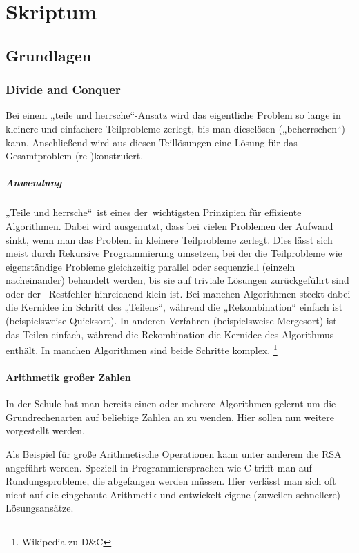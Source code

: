 \documentclass[a4paper,twoside,10pt]{report}
\begin{document}
\part{Skriptum}
\chapter{Grundlagen}
\section{Divide and Conquer}
Bei einem „teile und herrsche“-Ansatz wird das eigentliche Problem so lange in kleinere und einfachere Teilprobleme zerlegt, bis man diese\linebreak lösen („beherrschen“) kann. Anschließend wird aus diesen Teillösungen eine Lösung für das Gesamtproblem (re-)konstruiert.
\subsubsection{Anwendung}
„Teile und herrsche“ \,ist eines der \,wichtigsten Prinzipien für effiziente Algorithmen. Dabei wird ausgenutzt, dass bei vielen Problemen der Aufwand sinkt, wenn man das Problem in kleinere Teilprobleme zerlegt. Dies lässt sich meist durch Rekursive Programmierung umsetzen, bei der die Teilprobleme wie eigenständige Probleme gleichzeitig parallel oder sequenziell (einzeln nacheinander) behandelt werden, bis sie auf triviale Lö\-sungen zurückgeführt sind oder der \, Restfehler hinreichend klein ist. Bei manchen Algorithmen steckt dabei die Kernidee im Schritt des „Teilens“, während die „Rekombination“ einfach ist (beispielsweise Quicksort). In anderen \linebreak Verfahren (beispielsweise Mergesort) ist das Teilen einfach, während die Rekombination die Kernidee des Algorithmus enthält. In manchen Algorithmen sind beide Schritte komplex.
\footnote[1]{Wikipedia zu D\&C}
\subsection{Arithmetik großer Zahlen}
In der Schule hat man bereits einen oder mehrere Algorithmen gelernt um die Grundrechenarten auf beliebige Zahlen an zu wenden. Hier sollen nun weitere vorgestellt werden.

Als Beispiel für große Arithmetische Operationen kann unter anderem die RSA angeführt werden. Speziell in Programmiersprachen wie C trifft man auf Rundungsprobleme, die abgefangen werden müssen. Hier verlässt man sich oft nicht auf die eingebaute Arithmetik und entwickelt eigene (zuweilen schnellere) Lösungsansätze.
\end{document}
